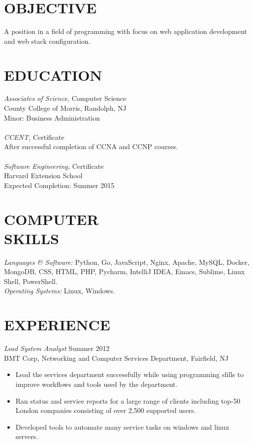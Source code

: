 \documentclass[line,margin]{res}
\begin{document}
\address{265  Main Road, Montville, NJ 07045 - 862-345-8316}
\address{github.com/odonnellryan - odonnellryanc@gmail.com}

\begin{resume}
 
\section{OBJECTIVE}	A position in a field of programming with focus 
	on web application development and web stack configuration.
 
\section{EDUCATION} {\sl Associates of Science,} Computer Science \\
		County College of Morris, Randolph, NJ  \\
	 	Minor: Business Administration \\ \\
	{\sl CCENT,} Certificate \\
		After successful completion of CCNA and CCNP courses. \\ \\
	{\sl Software Engineering,} Certificate \\
		Harvard Extension School \\
		Expected Completion: Summer 2015

\section{COMPUTER \\ SKILLS} {\sl Languages \& Software:} Python, Go, JavaScript, 
	Nginx, Apache, MySQL, Docker, MongoDB, CSS, HTML, PHP,
	Pycharm, IntelliJ IDEA, Emacs, Sublime, Linux Shell, PowerShell. \\
	{\sl Operating Systems:} Linux, Windows.

\section{EXPERIENCE} {\sl Lead System Analyst} \hfill Summer 2012 \\
	BMT Corp, Networking and Computer Services Department, Fairfield, NJ
	\begin{itemize}  \itemsep -2pt
		\item Lead the services department successfully while using programming slills to improve
			workflows and tools used by the department. 
		\item Ran status and service reports for a large range of clients including top-50
			London companies consisting of over 2,500 supported users.
		\item   Developed tools to automate many service tasks on windows and linux servers.
	\end{itemize}


\end{resume}
\end{document}
